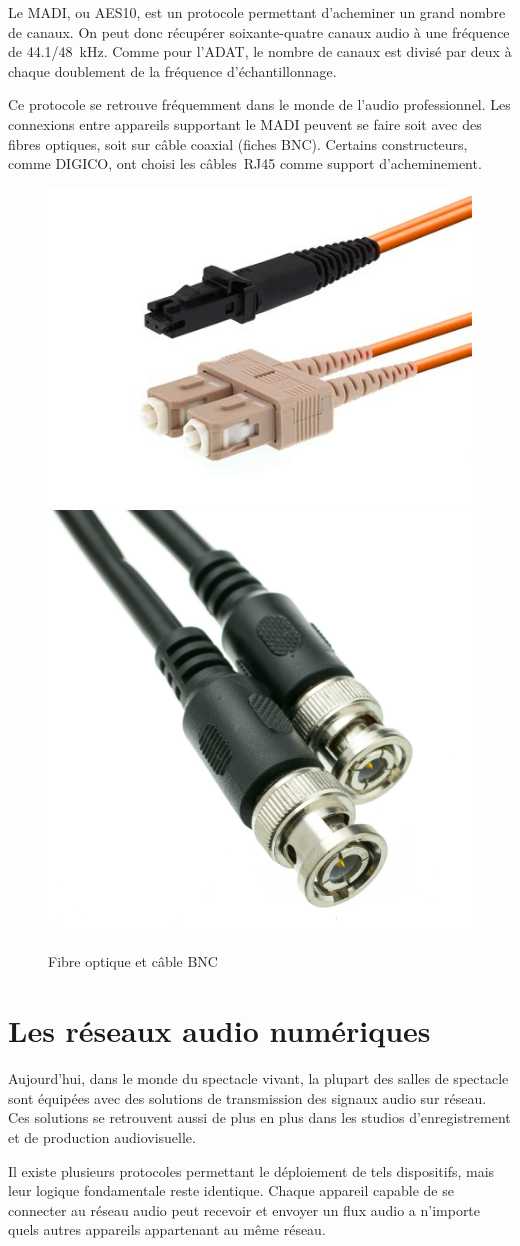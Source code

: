 \documentclass[
]{book}
\begin{document}
Le MADI, ou AES10, est un protocole permettant d'acheminer un grand nombre de canaux. On peut donc récupérer soixante-quatre canaux audio à une fréquence de 44.1/48~kHz. Comme pour l'ADAT, le nombre de canaux est divisé par deux à chaque doublement de la fréquence d'échantillonnage.

Ce protocole se retrouve fréquemment dans le monde de l'audio professionnel. Les connexions entre appareils supportant le MADI peuvent se faire soit avec des fibres optiques, soit sur câble coaxial (fiches BNC). Certains constructeurs, comme DIGICO, ont choisi les câbles~RJ45 comme support d'acheminement.

\begin{figure}

{\centering \includegraphics[width=0.3\linewidth]{_resources/bitmap/plug/fibre} \includegraphics[width=0.3\linewidth]{_resources/bitmap/plug/bnc} 

}

\caption{Fibre optique et câble BNC}\label{fig:unnamed-chunk-33}
\end{figure}

\hypertarget{les-ruxe9seaux-audio-numuxe9riques}{%
\section{Les réseaux audio numériques}\label{les-ruxe9seaux-audio-numuxe9riques}}

Aujourd'hui, dans le monde du spectacle vivant, la plupart des salles de spectacle sont équipées avec des solutions de transmission des signaux audio sur réseau. Ces solutions se retrouvent aussi de plus en plus dans les studios d'enregistrement et de production audiovisuelle.

Il existe plusieurs protocoles permettant le déploiement de tels dispositifs, mais leur logique fondamentale reste identique. Chaque appareil capable de se connecter au réseau audio peut recevoir et envoyer un flux audio a n'importe quels autres appareils appartenant au même réseau.
\end{document}
